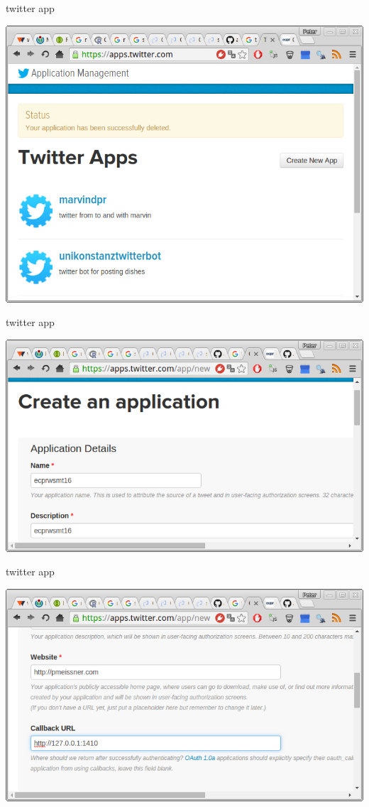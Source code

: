 \documentclass[ignorenonframetext,]{beamer}
\begin{document}
\begin{frame}{twitter app}

\includegraphics{fig/twitterapp1.png}

\end{frame}

\begin{frame}{twitter app}

\includegraphics{fig/twitterapp2.png}

\end{frame}

\begin{frame}{twitter app}

\includegraphics{fig/twitterapp3.png}

\end{frame}
\end{document}

